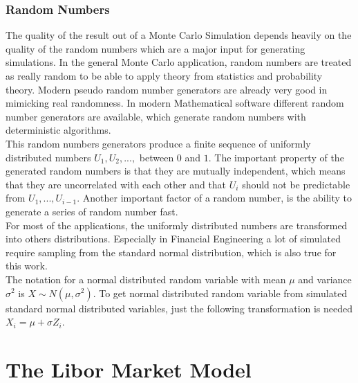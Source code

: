 \documentclass[11pt]{article}
\numberwithin{equation}{subsection}
\begin{document}
\subsubsection{Random Numbers}		
The quality of the result out of a Monte Carlo Simulation depends heavily on the quality of the random numbers which are a major input for generating simulations. In the general Monte Carlo application, random numbers are treated as really random to be able to apply theory from statistics and probability theory. Modern pseudo random number generators are already very good in mimicking real randomness. In modern Mathematical software different random number generators are available, which generate random numbers with deterministic algorithms.\\
This random numbers generators produce a finite sequence of uniformly distributed numbers \(U_1, U_2,...,\) between \(0\) and \(1\). The important property of the generated random numbers is that they are mutually independent, which means that they are uncorrelated with each other and that \(U_i\) should not be predictable from \(U_1,...,U_{i-1}\). Another important factor of a random number, is the ability to generate a series of random number fast.\\
For most of the applications, the uniformly distributed numbers are transformed into others distributions. Especially in Financial Engineering a lot of simulated require sampling from the standard normal distribution, which is also true for this work.\\
The notation for a normal distributed random variable with mean \(\mu\) and variance \(\sigma^2\) is \(X \sim N(\mu, \sigma^2)\). To get normal distributed random variable from simulated standard normal distributed variables, just the following transformation is needed
\(X_i = \mu + \sigma Z_i\).


\section{The Libor Market Model}
\end{document}
